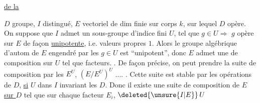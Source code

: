 \uline{ de la }

$D$ groupe, $I$  distingué, $E$ vectoriel de dim finie sur corps $k$, sur lequel $D$ opère. On suppose que $I$ admet un sous-groupe d'indice fini $U$,  tel que $g\in U\Rightarrow$ $g$ opère sur $E$ de façon \uline{unipotente}, i.e. valeurs propres  $1$. Alors le groupe algébrique d'autom de $E$ engendré par les $g\in U$ est ``unipotent'', donc  $E$ admet une  de composition sur $U$ tel que   facteurs. . De façon précise, on peut prendre la suite de composition par les $E^U$, $(E/E^U)^U$ .... . Cette suite est stable par les opérations de $D$, \uline{si}    $U$ dans $I$ invariant  les $D$. Donc il existe une suite de composition de $E$ \uline{sur $D$} tel que sur chaque facteur $E_i$, $\deleted{\unsure{I|E}}\,U$
